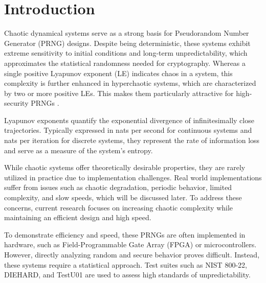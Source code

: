 \documentclass[preprint, 12pt, sort&compress]{elsarticle}
\begin{document}


\section{Introduction}
\label{Sec_1}


Chaotic dynamical systems serve as a strong basis for Pseudorandom Number Generator (PRNG) designs. Despite being deterministic, these systems exhibit extreme sensitivity to initial conditions and long-term unpredictability, which approximates the statistical randomness needed for cryptography. Whereas a single positive Lyapunov exponent (LE) indicates chaos in a system, this complexity is further enhanced in hyperchaotic systems, which are characterized by two or more positive LEs. This makes them particularly attractive for high-security PRNGs \cite{li_high-performance_2024,nguyen_designing_2022,al-azzawi_new_2023}. 

{\color{red}
Lyapunov exponents quantify the exponential divergence of infinitesimally close trajectories. Typically expressed in nats per second for continuous systems and nats per iteration for discrete systems, they represent the rate of information loss and serve as a measure of the system's entropy.
}

While chaotic systems offer theoretically desirable properties, they are rarely utilized in practice due to implementation challenges. Real world implementations suffer from issues such as chaotic degradation, periodic behavior, limited complexity, and slow speeds, which will be discussed later. To address these concerns, current research focuses on increasing chaotic complexity while maintaining an efficient design and high speed.

To demonstrate efficiency and speed, these PRNGs are often implemented in hardware, such as Field-Programmable Gate Array (FPGA) or microcontrollers. However, directly analyzing random and secure behavior proves difficult. Instead, these systems require a statistical approach. Test suites such as NIST 800-22, DIEHARD, and TestU01 are used to assess high standards of unpredictability.
\end{document}
